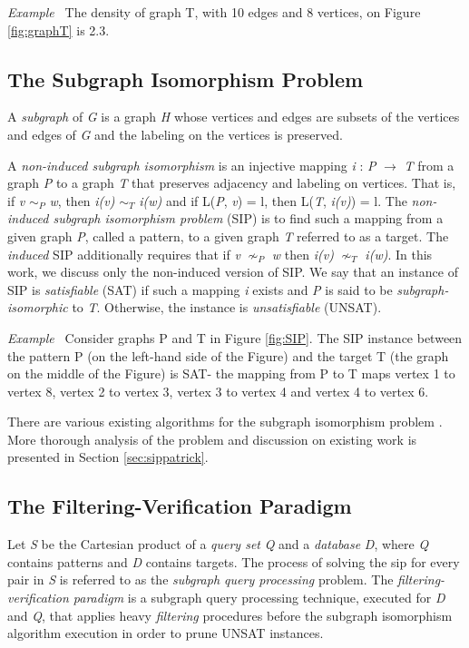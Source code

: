 \documentclass{l4proj}
\newcounter{example}[section]
\newenvironment{example}[1][]{\refstepcounter{example}\par\medskip
   \noindent \textit{Example~\theexample #1} \rmfamily}{\medskip}
\begin{document}
\begin{example}
The density of graph T, with 10 edges and 8 vertices, on Figure \ref{fig:graphT} is 2.3. %
\end{example}

\subsection{The Subgraph Isomorphism Problem}
A \emph{subgraph} of \emph{G} is a graph \emph{H} whose vertices and edges are subsets of the vertices and edges of \emph{G} and the labeling on the vertices is preserved.

A \emph{non-induced subgraph isomorphism} is an injective mapping \emph{i} : \emph{P} $\rightarrow$ \emph{T} from a graph \emph{P} to a graph \emph{T} that preserves adjacency and labeling on vertices. That is, if \emph{v} $\sim_{P}$ \emph{w}, then \emph{i(v)} $\sim_{T}$ \emph{i(w)} and if L(\emph{P}, \emph{v}) = l, then L(\emph{T}, \emph{i(v)}) = l. The \emph{non-induced subgraph isomorphism problem} (SIP) is to find such a mapping from a given graph \emph{P}, called a pattern, to a given graph \emph{T} referred to as a target. The \emph{induced} SIP additionally requires that if \emph{v} $\nsim_{P}$ \emph{w} then \emph{i(v)} $\nsim_{T}$ \emph{i(w)}. In this work, we discuss only the non-induced version of SIP. We say that an instance of SIP is \emph{satisfiable} (SAT) if such a mapping \emph{i} exists and \emph{P} is said to be \emph{subgraph-isomorphic} to \emph{T}. Otherwise, the instance is \emph{unsatisfiable} (UNSAT).

\begin{example}
\label{ex:sip}
Consider graphs P and T in Figure \ref{fig:SIP}. The SIP instance between the pattern P (on the left-hand side of the Figure) and the target T (the graph on the middle of the Figure) is SAT- the mapping from P to T maps vertex 1 to vertex 8, vertex 2 to vertex 3, vertex 3 to vertex 4 and vertex 4 to vertex 6.
\end{example}

There are various existing algorithms for the subgraph isomorphism problem \cite{vf2,Solnon:2010,CP2015,Larrosa:2002,Bonnici:2013,Zampelli:2010,nauty}. More thorough analysis of the problem and discussion on existing work is presented in Section \ref{sec:sippatrick}.

\subsection{The Filtering-Verification Paradigm}
Let \emph{S} be the Cartesian product of a \emph{query set} \emph{Q} and a \emph{database} \emph{D}, where \emph{Q} contains patterns and \emph{D} contains targets. The process of solving the \gls{sip} for every pair in \emph{S} is referred to as the \emph{subgraph query processing} problem. The \emph{filtering-verification paradigm} is a subgraph query processing technique, executed for \emph{D} and \emph{Q}, that applies heavy \emph{filtering} procedures before the subgraph isomorphism algorithm execution in order to prune UNSAT instances.
\end{document}
